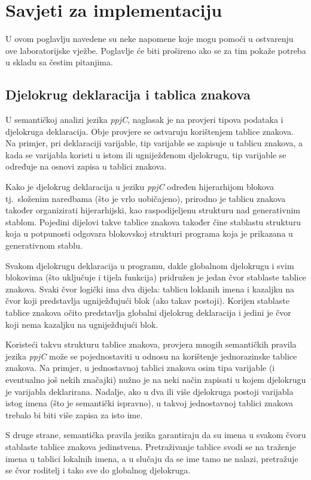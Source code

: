 \documentclass[times, 12pt, utf8]{book}
\begin{document}
\section{Savjeti za implementaciju}
U ovom poglavlju navedene su neke napomene koje mogu pomoći u ostvarenju ove laboratorijske vježbe.
Poglavlje će biti prošireno ako se za tim pokaže potreba u skladu sa čestim pitanjima.

\subsection{Djelokrug deklaracija i tablica znakova}
U semantičkoj analizi jezika \emph{ppjC}, naglasak je na provjeri tipova podataka i djelokruga deklaracija.
Obje provjere se ostvaruju korištenjem tablice znakova.
Na primjer, pri deklaraciji varijable, tip varijable se zapisuje u tablicu znakova, a kada se varijabla koristi u istom ili ugniježđenom djelokrugu, tip varijable se određuje na osnovi zapisa u tablici znakova.

Kako je djelokrug deklaracija u jeziku \emph{ppjC} određen hijerarhijom blokova tj.~složenim naredbama (što je vrlo uobičajeno), prirodno je tablicu znakova također organizirati hijerarhijski, kao raspodijeljenu strukturu nad generativnim stablom.
Pojedini dijelovi takve tablice znakova također čine stablastu strukturu koja u potpunosti odgovara blokovskoj strukturi programa koja je prikazana u generativnom stablu.

Svakom djelokrugu deklaracija u programu, dakle globalnom djelokrugu i svim blokovima (što uključuje i tijela funkcija) pridružen je jedan čvor stablaste tablice znakova.
Svaki čvor logički ima dva dijela: tablicu loklanih imena i kazaljku na čvor koji predstavlja ugniježđujući blok (ako takav postoji).
Korijen stablaste tablice znakova očito predstavlja globalni djelokrug deklaracija i jedini je čvor koji nema kazaljku na ugniježđujući blok.

Koristeći takvu strukturu tablice znakova, provjera mnogih semantičkih pravila jezika \emph{ppjC} može se pojednostaviti u odnosu na korištenje jednorazinske tablice znakova.
Na primjer, u jednostavnoj tablici znakova osim tipa varijable (i eventualno još nekih značajki) nužno je na neki način zapisati u kojem djelokrugu je varijabla deklarirana.
Nadalje, ako u dva ili više djelokruga postoji varijabla istog imena (što je semantički ispravno), u takvoj jednostavnoj tablici znakova trebalo bi biti više zapisa za isto ime.

S druge strane, semantička pravila jezika garantiraju da su imena u svakom čvoru stablaste tablice znakova jedinstvena.
Pretraživanje tablice svodi se na traženje imena u tablici lokalnih imena, a u slučaju da se ime tamo ne nalazi, pretražuje se čvor roditelj i tako sve do globalnog djelokruga.
\end{document}
